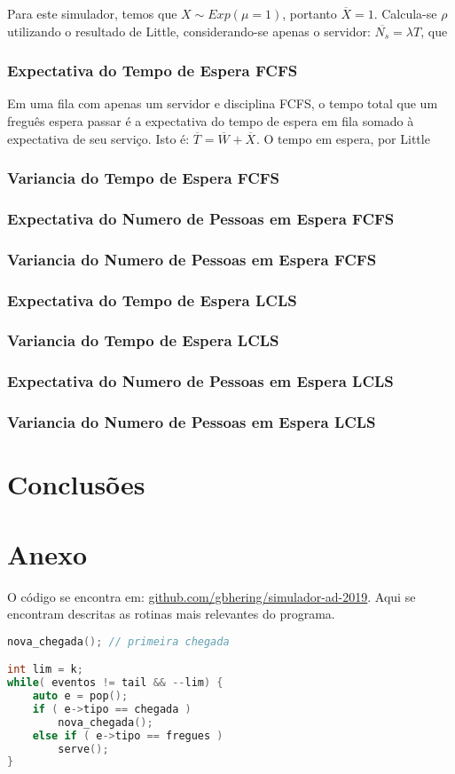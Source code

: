\documentclass{article}
\newcommand*\Time[1][]{\overline{ T_{#1} }}
\newcommand*\Wait[1][]{\overline{ W_{#1} }}
\newcommand*\Serv[1][]{\overline{ X_{#1} }}
\newcommand*\Peop[1][]{\overline{ N_{#1} }}
\begin{document}
Para este simulador, temos que $X \sim Exp( \mu = 1 )$, portanto $\overline{X} = 1$. Calcula-se $\rho$ utilizando o resultado de Little, considerando-se apenas o servidor: $\Peop[s] = \lambda T$, que 

\subsubsection{Expectativa do Tempo de Espera FCFS}
Em uma fila com apenas um servidor e disciplina FCFS, o tempo total que um freguês espera passar é a expectativa do tempo de espera em fila somado à expectativa de seu serviço. Isto é: $\Time = \Wait + \Serv$. O tempo em espera, por Little 
\subsubsection{Variancia do Tempo de Espera FCFS}
\subsubsection{Expectativa do Numero de Pessoas em Espera FCFS}
\subsubsection{Variancia do Numero de Pessoas em Espera FCFS}
\subsubsection{Expectativa do Tempo de Espera LCLS}
\subsubsection{Variancia do Tempo de Espera LCLS}
\subsubsection{Expectativa do Numero de Pessoas em Espera LCLS}
\subsubsection{Variancia do Numero de Pessoas em Espera LCLS}

\section{Conclusões}

\section{Anexo}

O código se encontra em: \url{github.com/gbhering/simulador-ad-2019}. Aqui se encontram descritas as rotinas mais relevantes do programa.

\begin{lstlisting}[language=C++, caption={Loop principal do programa}]
nova_chegada(); // primeira chegada

int lim = k;
while( eventos != tail && --lim) {
	auto e = pop();
	if ( e->tipo == chegada )
		nova_chegada();
	else if ( e->tipo == fregues )
		serve();
}
\end{lstlisting}
\end{document}
